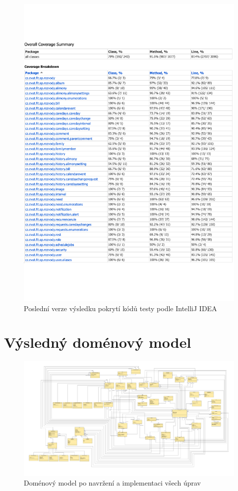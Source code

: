     \begin{figure}\centering
	    \includegraphics[width=1.0\textwidth]{pdfs/IntelliJ-IDEA-coverage-runner-results}
	    \caption[Pokrytí kódů testy podle JaCoCo]{Poslední verze výsledku pokrytí kódů testy podle IntelliJ IDEA}\label{image:intellij-coverage-result}
    \end{figure}
\chapter{Výsledný doménový model}\label{dodatek:DomainModel2}
    \begin{figure}\centering
	    \includegraphics[angle=90, height=0.9\textheight]{pdfs/DomainModel2}
	    \caption[Výsledný doménový model]{Doménový model po navržení a implementaci všech úprav}\label{image:DomainModel2}
    \end{figure}
